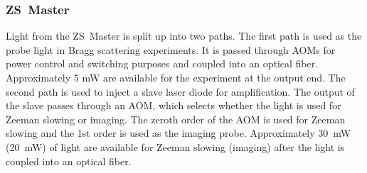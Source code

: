 \subsubsection{ZS~Master}
 
Light from the ZS~Master is split up into two paths.  The first path is used as
the probe light in Bragg scattering experiments. It is passed through AOMs for
power control and switching purposes and coupled into an optical fiber.
Approximately 5 mW are available for the experiment at the output end.  The
second path is used to inject a slave laser diode for amplification.  The
output of the slave passes through an AOM, which selects whether the light is
used for Zeeman slowing or imaging.  The zeroth order of the AOM is used for
Zeeman slowing and the 1st order is used as the imaging probe.   Approximately
30~mW (20~mW)  of light are available for Zeeman slowing (imaging) after the
light is coupled into an optical fiber.    

%
%
%

